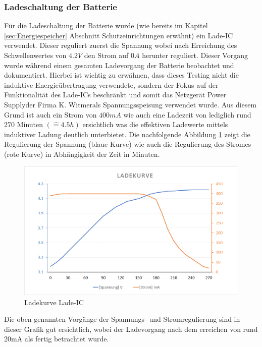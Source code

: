 \subsubsection*{Ladeschaltung der Batterie}\label{sec:batterie}
Für die Ladeschaltung der Batterie wurde (wie bereits im Kapitel \ref{sec:Energiespeicher} Abschnitt Schutzeinrichtungen erwähnt) ein Lade-IC verwendet. Dieser reguliert zuerst die Spannung wobei nach Erreichung des Schwellenwertes von $4.2V$ den Strom auf $0A$ herunter reguliert. Dieser Vorgang wurde während einem gesamten Ladevorgang der Batterie beobachtet und dokumentiert. Hierbei ist wichtig zu erwähnen, dass dieses Testing nicht die induktive Energieübertragung verwendete, sondern der Fokus auf der Funktionalität des Lade-ICs beschränkt und somit das Netzgerät \glqq Power Supply\grqq\space der Firma \glqq K. Witmer\grqq\space als Spannungsspeisung verwendet wurde. Aus diesem Grund ist auch ein Strom von $400mA$ wie auch eine Ladezeit von lediglich rund $270$ Minuten $(\hat{=} 4.5h)$ ersichtlich was die effektiven Ladewerte mittels induktiver Ladung deutlich unterbietet. Die nachfolgende Abbildung \ref{fig:LadekurveLadeIC} zeigt die Regulierung der Spannung (blaue Kurve) wie auch die Regulierung des Stromes (rote Kurve) in Abhängigkeit der Zeit in Minuten.

\begin{figure}[H]
	\begin{center}
		\includegraphics[width=120mm]{data/LadekurveLadeIC.png}
		\caption[Ladekurve Lade-IC]{Ladekurve Lade-IC} %
		\label{fig:LadekurveLadeIC}
	\end{center}
\end{figure}

Die oben genannten Vorgänge der Spannungs- und Stromregulierung sind in dieser Grafik gut ersichtlich, wobei der Ladevorgang nach dem erreichen von rund 20mA als fertig betrachtet wurde.

